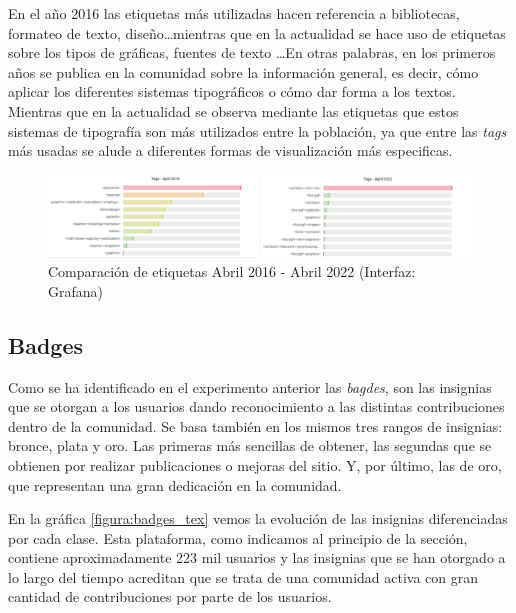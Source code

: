 \documentclass[a4paper, 12pt]{book}
\begin{document}
En el año 2016 las etiquetas más utilizadas hacen referencia a bibliotecas, formateo de texto, diseño\ldots mientras que en la actualidad se hace uso de etiquetas sobre los tipos de gráficas, fuentes de texto \ldots En otras palabras, en los primeros años se publica en la comunidad sobre la información general, es decir, cómo aplicar los diferentes sistemas tipográficos o cómo dar forma a los textos. Mientras que en la actualidad se observa mediante las etiquetas que estos sistemas de tipografía son más utilizados entre la población, ya que entre las \emph{tags} más usadas se alude a diferentes formas de visualización más especificas.

\begin{figure}[ht]
    \centering
    \includegraphics[width=\textwidth]{img/tex/Compare_tags_april_tex.png}
    \caption{Comparación de etiquetas Abril 2016 - Abril 2022 (Interfaz: Grafana)}
    \label{figura:comp_tags_tex}
\end{figure}



\subsection{Badges}

Como se ha identificado en el experimento anterior las \emph{bagdes}, son las insignias que se otorgan a los usuarios dando reconocimiento a las distintas contribuciones dentro de la comunidad. 
Se basa también en los mismos tres rangos de insignias: bronce, plata y oro. Las primeras más sencillas de obtener, las segundas que se obtienen por realizar publicaciones o mejoras del sitio. Y, por último, las de oro, que representan una gran dedicación en la comunidad. 

En la gráfica \ref{figura:badges_tex} vemos la evolución de las insignias diferenciadas por cada clase. Esta plataforma, como indicamos al principio de la sección, contiene aproximadamente 223 mil usuarios y las insignias que se han otorgado a lo largo del tiempo acreditan que se trata de una comunidad activa con gran cantidad de contribuciones por parte de los usuarios. 
\end{document}
